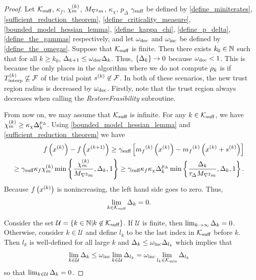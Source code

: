 \begin{proof}
Let
${\mathcal K_{\textrm{suff}}}$, $\kappa_f$, ${\chi_m^{(k)}}$, ${M_{\nabla^2 m}}$, $\kappa_{\chi}$, $p_{\Delta}$ $\gamma_{\textrm{suff}}$
be defined by
\cref{define_miniterates}, \cref{sufficient_reduction_theorem}, \cref{define_criticality_measure}, \cref{bounded_model_hessian_lemma}, \cref{define_kappa_chi}, \cref{define_p_delta}, \cref{define_the_gammas}
respectively,
and let $\omega_{\text{dec}}$ and $\omega_{\text{inc}}$ be defined by \cref{define_the_omegas}.
Suppose that ${\mathcal K_{\textrm{suff}}}$ is finite.
Then there exists $k_0 \in \mathbb N$ such that for all $k \ge  k_0$, $\Delta_{k+1} \le \omega_{\text{dec}} \Delta_k$.
Thus, $\left\{\Delta_k\right\} \to 0$ because $\omega_{\text{dec}} < 1$.
This is because the only places in the algorithm where we do not compute $\rho_k$ is if ${T_{\text{interp}}^{(k)}} \not \subseteq {\mathcal F}$ of the trial point ${{s}^{(k)}} \not \in {\mathcal F}$.
In both of these scenarios, the new trust region radius is decreased by $\omega_{\text{dec}}$.
Firstly, note that the trust region always decreases when calling the \emph{RestoreFeasibility} subroutine.

From now on, we may assume that ${\mathcal K_{\textrm{suff}}}$ is infinite.  
For any $k \in {\mathcal K_{\textrm{suff}}}$, we have ${\chi_m^{(k)}} \ge \kappa_{\chi}\Delta_k^{p_{\Delta}}$.
Using \cref{bounded_model_hessian_lemma} and \cref{sufficient_reduction_theorem} we have
\begin{align*}
f\left(x^{(k)}\right) - f\left({{x}^{(k+1)}}\right) \ge \gamma_{\textrm{suff}} \left[{{m}_f}^{(k)}\left(x^{(k)}\right) - {{m}_f}^{(k)}\left(x^{(k)} + {{s}^{(k)}}\right)\right] \\
\ge \gamma_{\textrm{suff}} \kappa_f {\chi_m^{(k)}} \min\left\{\frac{{\chi_m^{(k)}}}{{M_{\nabla^2 m}}}, \Delta_k, 1\right\}
\ge \gamma_{\textrm{suff}} \kappa_f \kappa_{\chi}\Delta_k^{p_{\Delta}}\min\left\{\frac{\Delta_k}{\tau_{\Delta} {M_{\nabla^2 m}}}, \Delta_k, 1\right\}.
\end{align*}
% 
Because $f\left(x^{(k)}\right)$ is nonincreasing, the left hand side goes to zero.
Thus,
\begin{align}
\lim_{k \in {\mathcal K_{\textrm{suff}}}} \Delta_k = 0.
\end{align}

Consider the set
$\mathcal U = \{ k \in \mathbb N | k \not \in {\mathcal K_{\textrm{suff}}} \}$.
If $\mathcal U$ is finite, then $\lim_{k\to\infty}\Delta_k = 0$.
Otherwise, consider $k \in \mathcal U$ and define $l_k$ to be the last index in ${\mathcal K_{\textrm{suff}}}$ before $k$.
Then $l_k$ is well-defined for all large $k$  and $\Delta_k \le \omega_{\text{inc}} \Delta_{l_k}$ which implies that
\begin{align}
\lim_{k \in \mathcal U } \Delta_k \le \omega_{\text{inc}} \lim_{k \in \mathcal U} \Delta_{l_k} = \omega_{\text{inc}} \lim_{l_k \in {\mathcal K_{\textrm{min}}}} \Delta_{l_k}
\end{align}
so that $\lim_{k \in \mathcal U} \Delta_k = 0$.
\end{proof}


